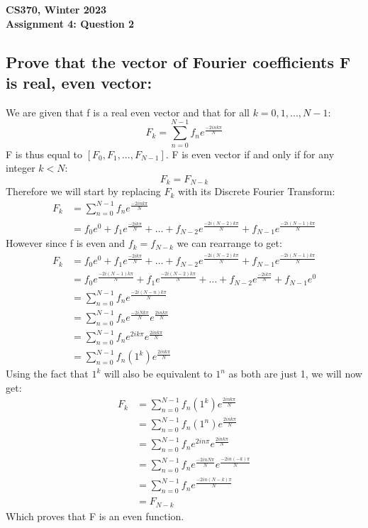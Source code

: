 \documentclass[12pt]{article}
\begin{document}
\begin{center}
{\Large\textbf{CS370, Winter 2023}}\\
\vspace{2mm}
{\Large\textbf{Assignment 4: Question 2}}\\
\vspace{3mm}
\end{center}

\begin{adjustwidth}{0em}{0pt}

\section*{Prove that the vector of Fourier coefficients F is real, even vector: }
We are given that f is a real even vector and that for all $k = 0, 1, ...,N-1$:
\[ F_k = \sum^{N-1}_{n=0}f_ne^{\frac{-2ink\pi}{N}} \]
F is thus equal to $[F_0, F_1, ..., F_{N-1}]$. F is even vector if and only if for any integer $k < N$:
\[ F_k = F_{N-k} \]
Therefore we will start by replacing $F_k$ with its Discrete Fourier Transform:
\begin{align*}
   F_k &= \sum^{N-1}_{n=0}f_ne^{\frac{-2ink\pi}{N}} \\
    &= f_0e^0 + f_1e^{\frac{-2ik\pi}{N}} + \dots + f_{N-2}e^{\frac{-2i(N-2)k\pi}{N}} 
    + f_{N-1}e^{\frac{-2i(N-1)k\pi}{N}}
\end{align*}
However since f is even and $f_k = f_{N-k}$ we can rearrange to get:
\begin{align*}
   F_k &= f_0e^0 + f_1e^{\frac{-2ik\pi}{N}} + \dots + f_{N-2}e^{\frac{-2i(N-2)k\pi}{N}} 
    + f_{N-1}e^{\frac{-2i(N-1)k\pi}{N}}\\
       &= f_0e^{\frac{-2i(N-1)k\pi}{N}} + f_1e^{\frac{-2i(N-2)k\pi}{N}} + \dots + f_{N-2}e^{\frac{-2ik\pi}{N}} 
    + f_{N-1}e^0\\
    &= \sum^{N-1}_{n=0}f_ne^{\frac{-2i(N-n)k\pi}{N}} \\
    &= \sum^{N-1}_{n=0}f_ne^{\frac{-2iNk\pi}{N}}e^{\frac{2ink\pi}{N}} \\
    &= \sum^{N-1}_{n=0}f_ne^{2ik\pi}e^{\frac{2ink\pi}{N}} \\
    &= \sum^{N-1}_{n=0}f_n(1^k)e^{\frac{2ink\pi}{N}}
\end{align*}
Using the fact that $1^k$ will also be equivalent to $1^n$ as both are just 1, we will now get:
\begin{align*}
   F_k &= \sum^{N-1}_{n=0}f_n(1^k)e^{\frac{2ink\pi}{N}} \\
   &= \sum^{N-1}_{n=0}f_n(1^n)e^{\frac{2ink\pi}{N}} \\
       &= \sum^{N-1}_{n=0}f_ne^{2in\pi}e^{\frac{2ink\pi}{N}} \\
       &= \sum^{N-1}_{n=0}f_ne^{\frac{-2inN\pi}{N}}e^{\frac{-2in(-k)\pi}{N}} \\
        &= \sum^{N-1}_{n=0}f_ne^{\frac{-2in(N-k)\pi}{N}} \\
        &= F_{N-k}
\end{align*}
Which proves that F is an even function.
\end{adjustwidth}
\end{document}
